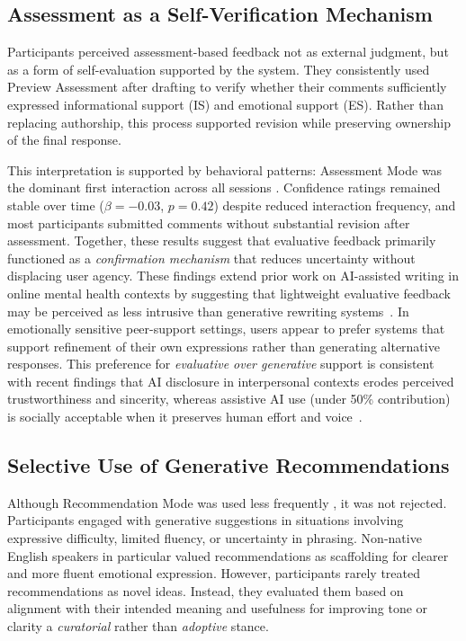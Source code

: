\documentclass[]{llncs}
\begin{document}
\subsection{Assessment as a Self-Verification Mechanism}
Participants perceived assessment-based feedback not as external judgment, but as a form of self-evaluation supported by the system. They consistently used Preview Assessment after drafting to verify whether their comments sufficiently expressed informational support (IS) and emotional support (ES). Rather than replacing authorship, this process supported revision while preserving ownership of the final response. 

This interpretation is supported by behavioral patterns: Assessment Mode was the dominant first interaction across all sessions . Confidence ratings remained stable over time ($\beta = -0.03$, $p = 0.42$) despite reduced interaction frequency, and most participants submitted comments without substantial revision after assessment. Together, these results suggest that evaluative feedback primarily functioned as a \textit{confirmation mechanism} that reduces uncertainty without displacing user agency.  These findings extend prior work on AI-assisted writing in online mental health contexts by suggesting that lightweight evaluative feedback may be perceived as less intrusive than generative rewriting systems~\cite{Sharma2023,Liao2023}. In emotionally sensitive peer-support settings, users appear to prefer systems that support refinement of their own expressions rather than generating alternative responses. This preference for \textit{evaluative over generative} support is consistent with recent findings that AI disclosure in interpersonal contexts erodes perceived trustworthiness and sincerity, whereas assistive AI use (under 50\% contribution) is socially acceptable when it preserves human effort and voice~\cite{Jakesch2019,Hwang2025Authenticity}.

\subsection{Selective Use of Generative Recommendations}
Although Recommendation Mode was used less frequently , it was not rejected. Participants engaged with generative suggestions in situations involving expressive difficulty, limited fluency, or uncertainty in phrasing. Non-native English speakers in particular  valued recommendations as scaffolding for clearer and more fluent emotional expression. However, participants rarely treated recommendations as novel ideas. Instead, they evaluated them based on alignment with their intended meaning and usefulness for improving tone or clarity a \textit{curatorial} rather than \textit{adoptive} stance.
\end{document}
